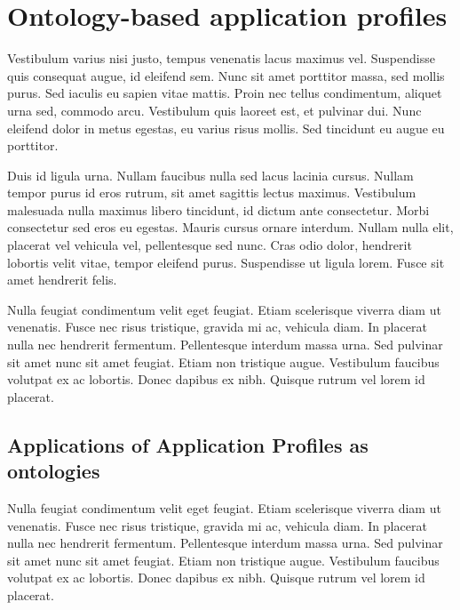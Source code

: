 
\section{Ontology-based application profiles} %
\label{sec:ontology_based_application_profiles}

Vestibulum varius nisi justo, tempus venenatis lacus maximus vel. Suspendisse quis consequat augue, id eleifend sem. Nunc sit amet porttitor massa, sed mollis purus. Sed iaculis eu sapien vitae mattis. Proin nec tellus condimentum, aliquet urna sed, commodo arcu. Vestibulum quis laoreet est, et pulvinar dui. Nunc eleifend dolor in metus egestas, eu varius risus mollis. Sed tincidunt eu augue eu porttitor.

Duis id ligula urna. Nullam faucibus nulla sed lacus lacinia cursus. Nullam tempor purus id eros rutrum, sit amet sagittis lectus maximus. Vestibulum malesuada nulla maximus libero tincidunt, id dictum ante consectetur. Morbi consectetur sed eros eu egestas. Mauris cursus ornare interdum. Nullam nulla elit, placerat vel vehicula vel, pellentesque sed nunc. Cras odio dolor, hendrerit lobortis velit vitae, tempor eleifend purus. Suspendisse ut ligula lorem. Fusce sit amet hendrerit felis.

Nulla feugiat condimentum velit eget feugiat. Etiam scelerisque viverra diam ut venenatis. Fusce nec risus tristique, gravida mi ac, vehicula diam. In placerat nulla nec hendrerit fermentum. Pellentesque interdum massa urna. Sed pulvinar sit amet nunc sit amet feugiat. Etiam non tristique augue. Vestibulum faucibus volutpat ex ac lobortis. Donec dapibus ex nibh. Quisque rutrum vel lorem id placerat.

\subsection{Applications of Application Profiles as ontologies} %
\label{sub:applications_of_aps_as_ontologies}

Nulla feugiat condimentum velit eget feugiat. Etiam scelerisque viverra diam ut venenatis. Fusce nec risus tristique, gravida mi ac, vehicula diam. In placerat nulla nec hendrerit fermentum. Pellentesque interdum massa urna. Sed pulvinar sit amet nunc sit amet feugiat. Etiam non tristique augue. Vestibulum faucibus volutpat ex ac lobortis. Donec dapibus ex nibh. Quisque rutrum vel lorem id placerat.


